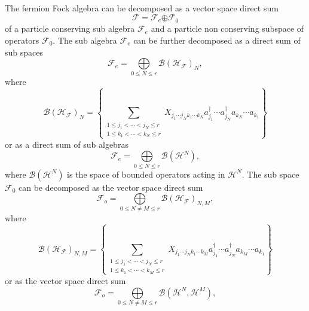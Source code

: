 \documentclass[aps,preprint]{revtex4}%
\begin{document}
The fermion Fock algebra can be decomposed as a vector space direct sum%
\begin{equation}
\mathcal{F=F}_{e}\mathcal{\oplus F}_{0}%
\end{equation}
of a particle conserving sub algebra $\mathcal{F}_{e}$ and a particle non
conserving subspace of operators $\mathcal{F}_{0}$. The sub algebra
$\mathcal{F}_{e}$ can be further decomposed as a direct sum of sub spaces
\begin{equation}
\mathcal{F}_{e}=%
{\displaystyle\bigoplus\limits_{0\leq N\leq r}}
\mathcal{B}\left(  \mathcal{H}_{\mathcal{F}}\right)  _{N}, \label{evenvect}%
\end{equation}
where
\begin{equation}
\mathcal{B}\left(  \mathcal{H}_{\mathcal{F}}\right)  _{N}=\left\{
\sum_{\substack{1\leq j_{1}<\cdots<j_{N}\leq r\\1\leq k_{1}<\cdots<k_{N}\leq
r}}X_{j_{1}\cdots j_{N}k_{1}\cdots k_{N}}a_{j_{1}}^{\dagger}\cdots a_{j_{N}%
}^{\dagger}a_{k_{N}}\cdots a_{k_{1}}\right\}
\end{equation}
or as a direct sum of sub algebras
\begin{equation}
\mathcal{F}_{e}=%
{\displaystyle\bigoplus\limits_{0\leq N\leq r}}
\mathcal{B}\left(  \mathcal{H}^{N}\right)  , \label{evenalg}%
\end{equation}
where $\mathcal{B}\left(  \mathcal{H}^{N}\right)  $ is the space of bounded
operators acting in $\mathcal{H}^{N}.$ The sub space $\mathcal{F}_{0}$ can be
decomposed as the vector space direct sum
\begin{equation}
\mathcal{F}_{o}=%
{\displaystyle\bigoplus\limits_{0\leq N\neq M\leq r}}
\mathcal{B}\left(  \mathcal{H}_{\mathcal{F}}\right)  _{N,M}, \label{oddsecond}%
\end{equation}
where
\begin{equation}
\mathcal{B}\left(  \mathcal{H}_{\mathcal{F}}\right)  _{N,M}=\left\{
\sum_{\substack{1\leq j_{1}<\cdots<j_{N}\leq r\\1\leq k_{1}<\cdots<k_{M}\leq
r}}X_{j_{1}\cdots j_{N}k_{1}\cdots k_{M}}a_{j_{1}}^{\dagger}\cdots a_{j_{N}%
}^{\dagger}a_{k_{M}}\cdots a_{k_{1}}\right\}
\end{equation}
or as the vector space direct sum
\begin{equation}
\mathcal{F}_{o}=%
{\displaystyle\bigoplus\limits_{0\leq N\neq M\leq r}}
\mathcal{B}\left(  \mathcal{H}^{N},\mathcal{H}^{M}\right)  , \label{oddfirst}%
\end{equation}
\end{document}
